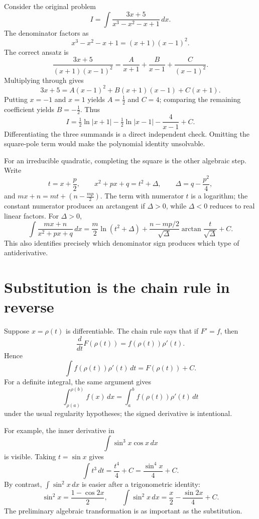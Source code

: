 \begin{example}
Consider the original problem
\[
 I=\int\frac{3x+5}{x^3-x^2-x+1}\,dx.
\]
The denominator factors as
\[
 x^3-x^2-x+1=(x+1)(x-1)^2.
\]
The correct ansatz is
\[
 \frac{3x+5}{(x+1)(x-1)^2}
   =\frac{A}{x+1}+\frac{B}{x-1}+\frac{C}{(x-1)^2}.
\]
Multiplying through gives
\[
 3x+5=A(x-1)^2+B(x+1)(x-1)+C(x+1).
\]
Putting \(x=-1\) and \(x=1\) yields \(A=\frac12\) and \(C=4\); comparing the remaining coefficient yields \(B=-\frac12\). Thus
\[
 \boxed{I=\tfrac12\ln|x+1|-\tfrac12\ln|x-1|
                  -\frac4{x-1}+C.}
\]
Differentiating the three summands is a direct independent check. Omitting the square-pole term would make the polynomial identity unsolvable.
\end{example}

For an irreducible quadratic, completing the square is the other algebraic step. Write
\[
 t=x+\frac p2,\qquad
 x^2+px+q=t^2+\Delta,\qquad \Delta=q-\frac{p^2}{4},
\]
and \(mx+n=mt+(n-\frac{mp}{2})\). The term with numerator \(t\) is a logarithm; the constant numerator produces an arctangent if \(\Delta>0\), while \(\Delta<0\) reduces to real linear factors. For \(\Delta>0\),
\[
 \int\frac{mx+n}{x^2+px+q}\,dx
 =\frac m2\ln(t^2+\Delta)
 +\frac{n-mp/2}{\sqrt\Delta}
       \arctan\frac{t}{\sqrt\Delta}+C.
\]
This also identifies precisely which denominator sign produces which type of antiderivative.

\section{Substitution is the chain rule in reverse}

Suppose \(x=\rho(t)\) is differentiable. The chain rule says that if \(F'=f\), then
\[
 \frac d{dt}F(\rho(t))=f(\rho(t))\rho'(t).
\]
Hence
\[
 \int f(\rho(t))\rho'(t)\,dt=F(\rho(t))+C.
\]
For a definite integral, the same argument gives
\[
 \int_{\rho(a)}^{\rho(b)}f(x)\,dx
 =\int_a^b f(\rho(t))\rho'(t)\,dt
\]
under the usual regularity hypotheses; the signed derivative is intentional.

For example, the inner derivative in
\[
 \int\sin^3x\cos x\,dx
\]
is visible. Taking \(t=\sin x\) gives
\[
 \int t^3\,dt=\frac{t^4}{4}+C
             =\boxed{\frac{\sin^4x}{4}+C}.
\]
By contrast, \(\int\sin^2x\,dx\) is easier after a trigonometric identity:
\[
 \sin^2x=\frac{1-\cos2x}{2},\qquad
 \int\sin^2x\,dx=\frac x2-\frac{\sin2x}{4}+C.
\]
The preliminary algebraic transformation is as important as the substitution.

